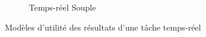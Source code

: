 \documentclass[french, a4paper, 11pt, twoside, pdftex]{StyleThese}
\begin{document}
\begin{figure}[ht!]
\begin{subfigure}{.3\textwidth}
        \caption[]{Temps-réel Souple}
        \label{fig:tempReelMou}
    \end{subfigure}
    \caption{Modèles d'utilité des résultats d'une tâche temps-réel}
    \label{fig:ModelesTempsReel}
\end{figure}

\ifdefined{}
\else


\end{document}

